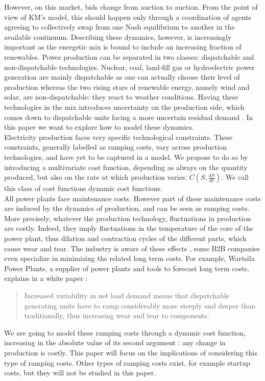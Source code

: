 However, on this market, bids change from auction to auction. From the point of view of KM's model, this should happen only through a coordination of agents agreeing to collectively swap from one Nash equilibrium to another in the available continuum. Describing these dynamics, however, is increasingly important as the energetic mix is bound to include an increasing fraction of renewables. Power production can be separated in two classes: dispatchable and non-dispatchable technologies. Nuclear, coal, land-fill gas or hydroelectric power generation are mainly dispatchable as one can actually choose their level of production whereas the two rising stars of renewable energy, namely wind and solar, are non-dispatchable: they react to weather conditions. Having these technologies in the mix introduces uncertainty on the production side, which comes down to dispatchable units facing a more uncertain residual demand \cite{Boyle}. In this paper we want to explore how to model these dynamics. \\

Electricity production faces very specific technological constraints. These constraints, generally labelled as ramping costs, vary across production technologies, and have yet to be captured in a model. We propose to do so by introducing a multivariate cost function, depending as always on the quantity produced, but also on the rate at which production varies: $C(S,\frac{dS}{dt})$. We call this class of cost functions dynamic cost functions.\\

All power plants face maintenance costs. However part of these maintenance costs are induced by the dynamics of production, and can be seen as ramping costs. More precisely, whatever the production technology, fluctuations in production are costly. Indeed, they imply fluctuations in the temperature of the core of the power plant, thus dilation and contraction cycles of the different parts, which cause wear and tear. The industry is aware of these effects \cite{GE}, some B2B companies even specialize in minimizing the related long term costs. For example, Wartsila Power Plants, a supplier of power plants and tools to forecast long term costs, explains in a white paper \cite{Arima}: 
\begin{quote}
Increased variability in net load demand means that dispatchable generating units have to ramp considerably more steeply and deeper than traditionally, thus increasing wear and tear to components.
\end{quote}
We are going to model these ramping costs through a dynamic cost function, increasing in the absolute value of its second argument : any change in production is costly. This paper will focus on the implications of considering this type of ramping costs. Other types of ramping costs exist, for example startup costs, but they will not be studied in this paper. \\

